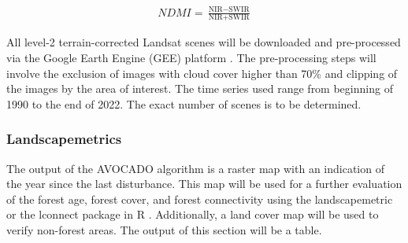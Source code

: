 \begin{align}
\label{eq:NDMI}
NDMI = \frac{\text{NIR} - \text{SWIR}}{\text{NIR} + \text{SWIR}}
\end{align}

All level-2 terrain-corrected Landsat scenes will be downloaded and pre-processed via the Google Earth Engine (GEE) platform \citep{gorelickGoogleEarthEngine2017}. The pre-processing steps will involve the exclusion of images with cloud cover higher than 70\% and clipping of the images by the area of interest. The time series used range from beginning of 1990 to the end of 2022. The exact number of scenes is to be determined. 


\subsubsection{Landscapemetrics}
The output of the AVOCADO algorithm is a raster map with an indication of the year since the last disturbance. This map will be used for a further evaluation of the forest age, forest cover, and forest connectivity using the landscapemetric or the lconnect package in R \citep{mestreLconnectPackageVersatile2023, hesselbarthLandscapemetricsOpensourceTool2019}. Additionally, a land cover map will be used to verify non-forest areas. The output of this section will be a table.

